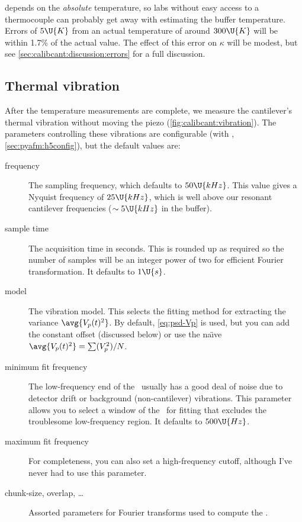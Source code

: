  depends on the \emph{absolute} temperature, so labs
without easy access to a thermocouple can probably get away with
estimating the buffer temperature.  Errors of $5\U{K}$ from an actual
temperature of around $300\U{K}$ will be within 1.7\% of the actual
value.  The effect of this error on $\kappa$ will be modest, but see
\cref{sec:calibcant:discussion:errors} for a full discussion.

\subsection{Thermal vibration}
\label{sec:calibcant:vibration}

After the temperature measurements are complete, we measure the
cantilever's thermal vibration without moving the piezo
(\cref{fig:calibcant:vibration}).  The parameters controlling these
vibrations are configurable (with \hFconfig,
\cref{sec:pyafm:h5config}), but the default values are:

\begin{description}
  \item[frequency] The sampling frequency, which defaults to
    $50\U{kHz}$.  This value gives a Nyquist frequency of $25\U{kHz}$,
    which is well above our resonant cantilever frequencies
    ($\sim5\U{kHz}$ in the buffer).
  \item[sample time] The acquisition time in seconds.  This is rounded
    up as required so the number of samples will be an integer power
    of two for efficient Fourier transformation.  It defaults to
    $1\U{s}$.
  \item[model] The vibration model.  This selects the fitting method
    for extracting the variance $\avg{V_p(t)^2}$.  By default,
    \cref{eq:psd-Vp} is used, but you can add the constant offset
    (discussed below) or use the na\"{\i}ve
    $\avg{V_p(t)^2}=\sum(V_p^2)/N$.
  \item[minimum fit frequency] The low-frequency end of the
    \PSD\ usually has a good deal of noise due to detector drift or
    background (non-cantilever) vibrations.  This parameter allows
    you to select a window of the \PSD\ for fitting that excludes the
    troublesome low-frequency region.  It defaults to $500\U{Hz}$.
  \item[maximum fit frequency] For completeness, you can also set a
    high-frequency cutoff, although I've never had to use this
    parameter.
  \item[chunk-size, overlap, \ldots] Assorted parameters for Fourier
    transforms used to compute the \PSD.
\end{description}

